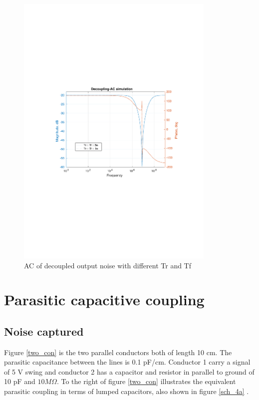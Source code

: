 \documentclass[12pt,a4paper,UKenglish]{article}
\begin{document}
\begin{figure} [H]
  \centering 
  \includegraphics[width=0.85\textwidth]{img/3f_ac.pdf} 
  \caption{AC of decoupled output noise with different Tr and Tf}
  \label{cap_ac2} 
\end{figure}

\section{Parasitic capacitive coupling}
\subsection{Noise captured}
Figure \ref{two_con} is the two parallel conductors both of length 10 cm. The parasitic capacitance between the lines is 0.1 pF/cm. Conductor 1 carry a signal of 5 V swing and conductor 2 has a capacitor and resistor in parallel to ground of 10 pF and $10 M\Omega$. To the right of  figure \ref{two_con} illustrates the equivalent parasitic coupling in terms of lumped capacitors, also shown in figure  \ref{sch_4a} . 
\end{document}
